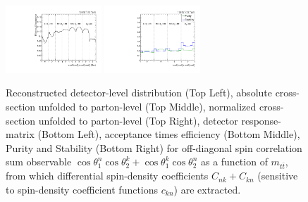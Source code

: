 \begin{figure}[htb]
\begin{center}
 \includegraphics[width=0.32\textwidth]{fig_fullRun2UL/unfolding/combined/TotEff_c_Pnk_mttbar.pdf}
 \includegraphics[width=0.32\textwidth]{fig_fullRun2UL/unfolding/combined/PurStab_c_Pnk_mttbar.pdf} \\
\caption{Reconstructed detector-level distribution (Top Left), absolute cross-section unfolded to parton-level (Top Middle), normalized cross-section unfolded to parton-level (Top Right), detector response-matrix (Bottom Left), acceptance times efficiency (Bottom Middle), Purity and Stability (Bottom Right) for off-diagonal spin correlation sum observable $\cos\theta_{1}^{n}\cos\theta_{2}^{k}+\cos\theta_{1}^{k}\cos\theta_{2}^{n}$ as a function of $m_{t\bar{t}}$, from which differential spin-density coefficients $C_{nk}+C_{kn}$ (sensitive to spin-density coefficient functions $c_{k n}$) are extracted.}
\label{fig:c_Pnk_mttbar}
\end{center}
\end{figure}
\clearpage
